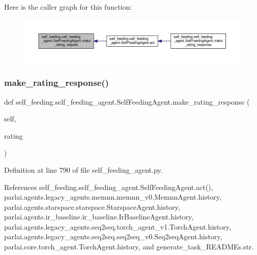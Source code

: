Here is the caller graph for this function\+:
\nopagebreak
\begin{figure}[H]
\begin{center}
\leavevmode
\includegraphics[width=350pt]{classself__feeding_1_1self__feeding__agent_1_1SelfFeedingAgent_abc842083fdfd34983ed64bd7dc8d8b4a_icgraph}
\end{center}
\end{figure}
\mbox{\label{classself__feeding_1_1self__feeding__agent_1_1SelfFeedingAgent_a36a79f932c2ba47838596bc88c26625d}} 
\subsubsection{\texorpdfstring{make\+\_\+rating\+\_\+response()}{make\_rating\_response()}}
{\footnotesize\ttfamily def self\+\_\+feeding.\+self\+\_\+feeding\+\_\+agent.\+Self\+Feeding\+Agent.\+make\+\_\+rating\+\_\+response (\begin{DoxyParamCaption}\item[{}]{self,  }\item[{}]{rating }\end{DoxyParamCaption})}



Definition at line 790 of file self\+\_\+feeding\+\_\+agent.\+py.



References self\+\_\+feeding.\+self\+\_\+feeding\+\_\+agent.\+Self\+Feeding\+Agent.\+act(), parlai.\+agents.\+legacy\+\_\+agents.\+memnn.\+memnn\+\_\+v0.\+Memnn\+Agent.\+history, parlai.\+agents.\+starspace.\+starspace.\+Starspace\+Agent.\+history, parlai.\+agents.\+ir\+\_\+baseline.\+ir\+\_\+baseline.\+Ir\+Baseline\+Agent.\+history, parlai.\+agents.\+legacy\+\_\+agents.\+seq2seq.\+torch\+\_\+agent\+\_\+v1.\+Torch\+Agent.\+history, parlai.\+agents.\+legacy\+\_\+agents.\+seq2seq.\+seq2seq\+\_\+v0.\+Seq2seq\+Agent.\+history, parlai.\+core.\+torch\+\_\+agent.\+Torch\+Agent.\+history, and generate\+\_\+task\+\_\+\+R\+E\+A\+D\+M\+Es.\+str.

